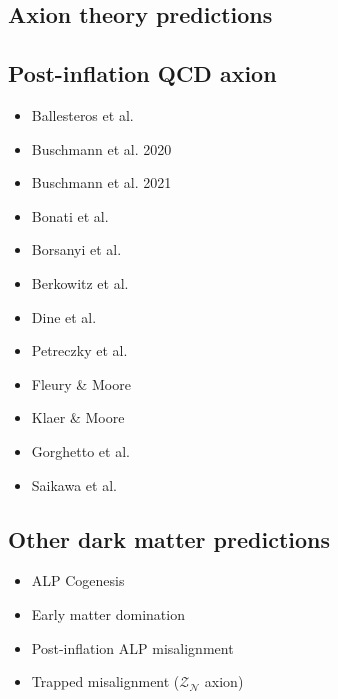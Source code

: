 \documentclass[9pt,twocolumn]{extarticle}
\begin{document}
\begin{mdframed}
\vspace{-1em}
\section{Axion theory predictions}\vspace{-0.5em}
\subsection{Post-inflation QCD axion}
\begin{itemize}\setlength\itemsep{-0.5em}
	\item Ballesteros et al.~\cite{Ballesteros:2016euj}	
	\item Buschmann et al. 2020~\cite{Buschmann:2019icd}
	\item Buschmann et al. 2021~\cite{Buschmann:2021sdq}
	\item Bonati et al.~\cite{Bonati:2015vqz}
	\item Borsanyi et al.~\cite{Borsanyi:2016ksw}
	\item Berkowitz et al.~\cite{Berkowitz:2015aua}
	\item Dine et al.~\cite{Dine:2017swf}
	\item Petreczky et al.~\cite{Petreczky:2016vrs}
	\item Fleury \& Moore~\cite{Fleury:2015aca}
	\item Klaer \& Moore~\cite{Klaer:2017ond}
	\item Gorghetto et al.~\cite{Gorghetto:2021fsn}
	\item Saikawa et al.~\cite{IAXO:2019mpb}	
\end{itemize}

\subsection{Other dark matter predictions}
\begin{itemize}\setlength\itemsep{-0.5em}
	\item ALP Cogenesis~\cite{Co:2020xlh}
	\item Early matter domination~\cite{Blinov:2019rhb}
	\item Post-inflation ALP misalignment~\cite{Arias:2012az,OHare:2021zrq}
	\item Trapped misalignment ($\mathcal{Z}_\mathcal{N}$ axion)~\cite{DiLuzio:2021gos}
\end{itemize}
\end{mdframed}
\end{document}
